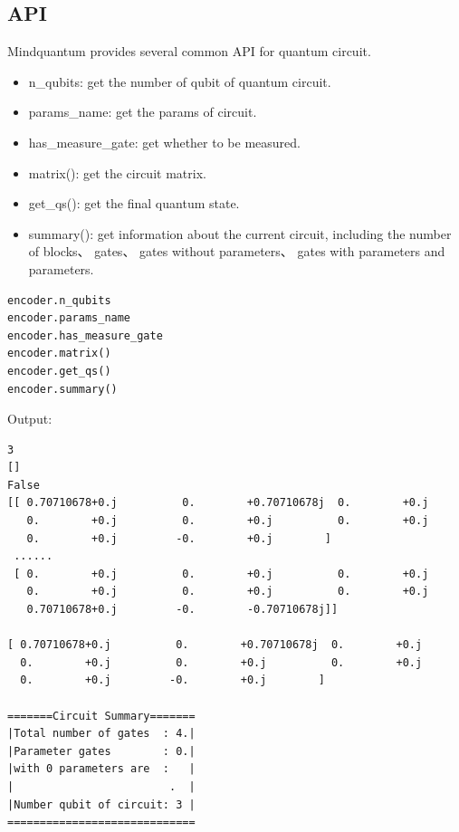 \subsection{API}
Mindquantum provides several common API for quantum circuit.
\begin{itemize}
    \item n\_qubits: get the number of qubit of quantum circuit.
    \item params\_name: get the params of circuit.
    \item has\_measure\_gate: get whether to be measured.
    \item matrix(): get the circuit matrix.
    \item get\_qs(): get the final quantum state.
    \item summary(): get information about the current circuit, including the number of blocks、 gates、 gates without parameters、 gates with parameters and parameters.
\end{itemize}
\begin{lstlisting}
encoder.n_qubits
encoder.params_name
encoder.has_measure_gate
encoder.matrix() 
encoder.get_qs()
encoder.summary()
\end{lstlisting}
Output:
\begin{lstlisting}
3
[]
False
[[ 0.70710678+0.j          0.        +0.70710678j  0.        +0.j
   0.        +0.j          0.        +0.j          0.        +0.j
   0.        +0.j         -0.        +0.j        ]
 ......
 [ 0.        +0.j          0.        +0.j          0.        +0.j
   0.        +0.j          0.        +0.j          0.        +0.j
   0.70710678+0.j         -0.        -0.70710678j]]
   
[ 0.70710678+0.j          0.        +0.70710678j  0.        +0.j
  0.        +0.j          0.        +0.j          0.        +0.j
  0.        +0.j         -0.        +0.j        ]
  
=======Circuit Summary=======
|Total number of gates  : 4.|
|Parameter gates        : 0.|
|with 0 parameters are  :   |
|                        .  |
|Number qubit of circuit: 3 |
=============================  
\end{lstlisting}
